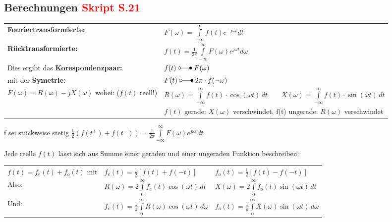 	\subsection{Berechnungen \small{\textcolor{red}{Skript S.21}}}%
		\vspace{-2mm}	%
		\begin{tabular}{|p{6cm} l|} \hline
			\textbf{Fouriertransformierte:} &
			$F(\omega) = \int\limits_{-\infty}^{\infty} f(t)e^{-j\omega t}dt$ \\
			\textbf{Rücktransformierte:} &
			$f(t) = \frac{1}{2\pi}\int\limits_{-\infty}^{\infty}F(\omega)e^{j\omega t}d\omega$ \\ \hline
		
		Dies ergibt das \textbf{Korespondenzpaar:} & $f(t) \; \laplace \; F(\omega)$ \\
		mit der \textbf{Symetrie:} & $F(t) \; \laplace \; 2\pi \cdot f(-\omega)$ \\
		
		$F(\omega) = R(\omega) -jX(\omega)$ wobei: ($f(t)$ reell!) &
		$R(\omega) = \int\limits_{-\infty}^\infty f(t)\cdot \cos(\omega t)\,dt \quad\quad X(\omega) =
		\int\limits_{-\infty}^\infty f(t)\cdot \sin(\omega t)\,dt$
		\\
		&$f(t)$ gerade: $X(\omega)$ verschwindet, f(t) ungerade: $R(\omega)$ verschwindet \\
		\hline
		\end{tabular}
		
		f sei stückweise stetig $\frac{1}{2}(f(t^+) + f(t^-)) = \frac{1}{2\pi} \int\limits_{-\infty}^{\infty}F(\omega)e^{j\omega t} dt$
		
		Jede reelle $f(t)$ lässt sich aus Summe einer geraden und einer ungeraden Funktion beschreiben:\\[3mm]
		\begin{tabular}{lll}
			$f(t) = f_e(t) + f_o(t)$ mit & $f_e(t) = \frac{1}{2}[f(t) + f(-t)]$ & $f_o(t) = \frac{1}{2}[f(t) - f(-t)]$ \\[3mm]
			
			Also: & $R(\omega) = 2 \int\limits_0^\infty f_e(t) \cos(\omega t)\,dt$ & $X(\omega) = 2 \int\limits_0^\infty
			f_o(t) \sin(\omega t)\,dt$ \\[3mm]
			
			Und: & $f_e(t) = \frac{1}{\pi}\int\limits_0^\infty R(\omega)\cos(\omega t)\,d\omega$ & 
			$f_o(t) = \frac{1}{\pi}\int\limits_0^\infty X(\omega)\sin(\omega t)\,d\omega$ \\[3mm]
		\end{tabular}
		
